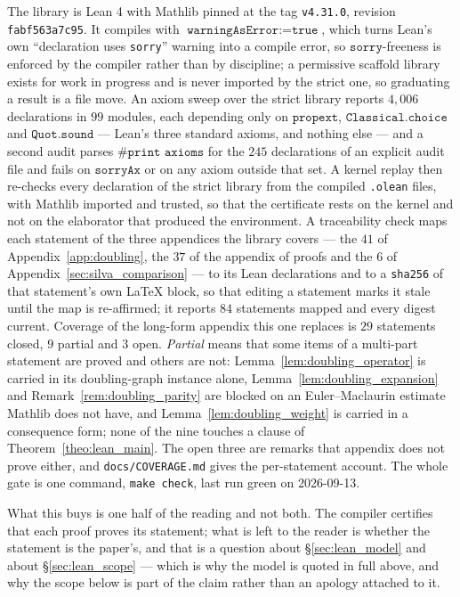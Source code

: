 The library is Lean 4 with Mathlib pinned at the tag \texttt{v4.31.0}, revision
\texttt{fabf563a7c95}. It compiles with $\texttt{warningAsError}:=\texttt{true}$, which turns
Lean's own ``declaration uses \texttt{sorry}'' warning into a compile error, so
$\texttt{sorry}$-freeness is enforced by the compiler rather than by discipline; a permissive
scaffold library exists for work in progress and is never imported by the strict one, so
graduating a result is a file move. An axiom sweep over the strict library reports
$4{,}006$ declarations in $99$ modules, each depending only on $\texttt{propext}$,
$\texttt{Classical.choice}$ and $\texttt{Quot.sound}$ --- Lean's three standard axioms, and
nothing else --- and a second audit parses $\texttt{\#print axioms}$ for the $245$ declarations
of an explicit audit file and fails on $\texttt{sorryAx}$ or on any axiom outside that set. A
kernel replay then re-checks every declaration of the strict library from the compiled
\texttt{.olean} files, with Mathlib imported and trusted, so that the certificate rests on the
kernel and not on the elaborator that produced the environment. A traceability check maps each
statement of the three appendices the library covers --- the $41$ of
Appendix~\ref{app:doubling}, the $37$ of the appendix of proofs and the $6$ of
Appendix~\ref{sec:silva_comparison} --- to its Lean declarations and to a \texttt{sha256} of
that statement's own \LaTeX{} block, so that editing a statement marks it stale until the map
is re-affirmed; it reports $84$ statements mapped and every digest current. Coverage of the
long-form appendix this one replaces is $29$ statements closed, $9$ partial and $3$ open.
\emph{Partial} means that some items of a multi-part statement are proved and others are not:
Lemma~\ref{lem:doubling_operator} is carried in its doubling-graph instance alone,
Lemma~\ref{lem:doubling_expansion} and Remark~\ref{rem:doubling_parity} are blocked on an
Euler--Maclaurin estimate Mathlib does not have, and Lemma~\ref{lem:doubling_weight} is carried
in a consequence form; none of the nine touches a clause of Theorem~\ref{theo:lean_main}. The
open three are remarks that appendix does not prove either, and
\texttt{docs/COVERAGE.md} gives the per-statement account. The whole gate is one command,
\texttt{make check}, last run green on 2026-09-13.

What this buys is one half of the reading and not both. The compiler certifies that each proof
proves its statement; what is left to the reader is whether the statement is the paper's, and
that is a question about \S\ref{sec:lean_model} and about \S\ref{sec:lean_scope} --- which is
why the model is quoted in full above, and why the scope below is part of the claim rather than
an apology attached to it.

